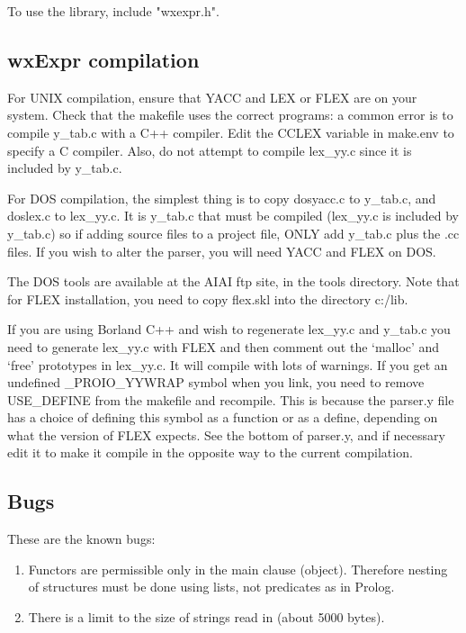 To use the library, include "wxexpr.h".

\subsection{wxExpr compilation}

For UNIX compilation, ensure that YACC and LEX or FLEX are on your system. Check that
the makefile uses the correct programs: a common error is to compile
y\_tab.c with a C++ compiler. Edit the CCLEX variable in make.env
to specify a C compiler. Also, do not attempt to compile lex\_yy.c
since it is included by y\_tab.c.

For DOS compilation, the simplest thing is to copy dosyacc.c to y\_tab.c, and doslex.c to
lex\_yy.c. It is y\_tab.c that must be compiled (lex\_yy.c is included by
y\_tab.c) so if adding source files to a project file, ONLY add y\_tab.c
plus the .cc files. If you wish to alter the parser, you will need YACC
and FLEX on DOS.

The DOS tools are available at the AIAI ftp site, in the tools directory. Note that
for FLEX installation, you need to copy flex.skl into the directory
c:/lib.

If you are using Borland C++ and wish to regenerate lex\_yy.c and y\_tab.c
you need to generate lex\_yy.c with FLEX and then comment out the `malloc' and `free'
prototypes in lex\_yy.c. It will compile with lots of warnings. If you
get an undefined \_PROIO\_YYWRAP symbol when you link, you need to remove
USE\_DEFINE from the makefile and recompile. This is because the parser.y
file has a choice of defining this symbol as a function or as a define,
depending on what the version of FLEX expects. See the bottom of
parser.y, and if necessary edit it to make it compile in the opposite
way to the current compilation.


\subsection{Bugs}

These are the known bugs:

\begin{enumerate}\itemsep=0pt
\item Functors are permissible only in the main clause (object).
Therefore nesting of structures must be done using lists, not predicates
as in Prolog.
\item There is a limit to the size of strings read in (about 5000 bytes).
\end{enumerate}

